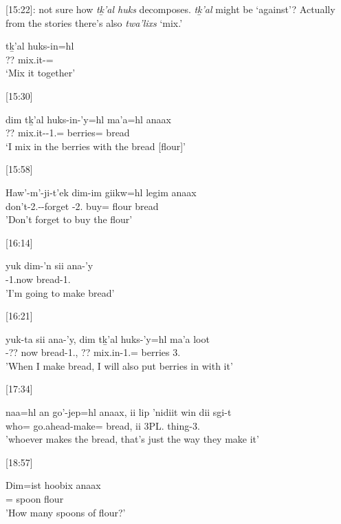 [15:22]: not sure how \textit{tḵ'al huks} decomposes. \textit{tḵ'al} might be `against'? Actually from the stories there's also \textit{twa'lixs} `mix.'

\begin{exe}
\ex \gll tḵ'al huks-in=hl\\ 
?? mix.it-=\Cn{}\\ 
`Mix it together'
\end{exe}

[15:30]

\begin{exe}
\ex \gll dim tḵ'al huks-in-'y=hl ma'a=hl anaax\\ 
\Fut{} ?? mix.it--1.\Ii{}=\Cn{} berries=\Cn{} bread\\ 
`I mix in the berries with the bread [flour]'
\end{exe}

[15:58]
\begin{exe}
\ex \gll Haw'-m'-ji-t'ek dim-im giikw=hl legim anaax\\
don't-2.\I{}-\Irr{}-forget \Fut{}-2.\I{} buy=\Cn{} flour bread\\
'Don't forget to buy the flour'
\end{exe}

[16:14]
\begin{exe}
\ex \gll yuk dim-'n sii ana-'y \\
\Prog{} \Fut{}-1.\I now bread-1.\Ii{} \\
'I'm going to make bread'
\end{exe}

[16:21]
\begin{exe}
\ex \gll yuk-ta sii ana-'y, dim tḵ'al huks-'y=hl ma'a loot \\
\Prog{}-?? now bread-1.\I{}, \Fut{} ?? mix.in-1.\I{}=\Cn{} berries 3.\Prep{} \\
'When I make bread, I will also put berries in with it'
\end{exe}

[17:34]
\begin{exe}
\ex \gll naa=hl an go'-jep=hl anaax, ii lip 'nidiit win dii sgi-t \\
who=\Cn{} \Sx{} go.ahead-make=\Cn{} bread, ii \Refl{} 3PL.\Iii{} \Comp{} \Foc{} thing-3.\Ii{} \\
'whoever makes the bread, that's just the way they make it'
\end{exe}

[18:57]
\begin{exe}
    \ex \gll Dim=ist hoobix anaax\\
    \Fut{}=\Qudd{} spoon flour\\
    'How many spoons of flour?'
\end{exe}

